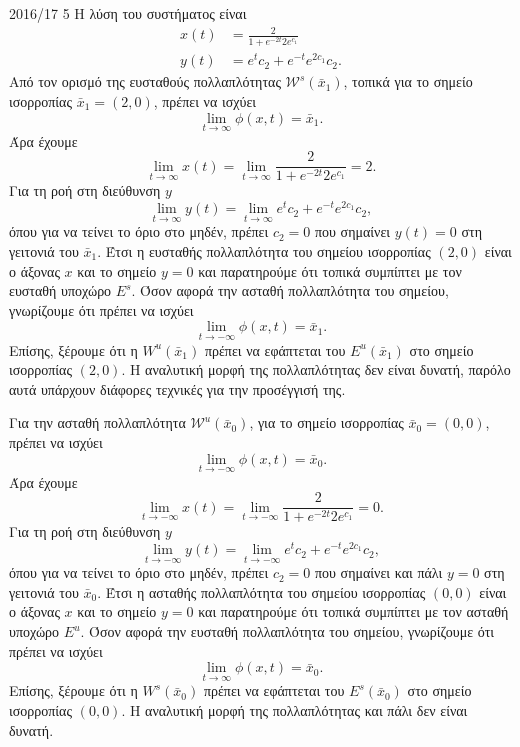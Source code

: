 \begin{solution}{2016/17 5}
    Η λύση του συστήματος είναι
    \begin{align*}
        x(t) &= \frac{2}{1 + e^{-2t}2e^{c_1}} \\
        y(t) &= e^{t}c_2 + e^{-t}e^{2c_1}c_2.
    \end{align*}
    Από τον ορισμό της ευσταθούς πολλαπλότητας \( \mathcal{W}^s(\bar{x}_1) \),
    τοπικά για το σημείο ισορροπίας \( \bar{x}_1 = (2, 0) \), πρέπει να ισχύει
    \[
        \lim_{t \to \infty} \phi(x, t) = \bar{x}_1.
    \]
    Άρα έχουμε
    \[
        \lim_{t \to \infty} x(t) =
        \lim_{t \to \infty} \frac{2}{1 + e^{-2t}2e^{c_1}} = 2.
    \]
    Για τη ροή στη διεύθυνση \( y \)
    \[
        \lim_{t \to \infty} y(t) =
        \lim_{t \to \infty} e^{t}c_2 + e^{-t}e^{2c_1}c_2,
    \]
    όπου για να τείνει το όριο στο μηδέν, πρέπει \( c_2 = 0 \) που σημαίνει
    \( y(t) = 0 \) στη γειτονιά του \( \bar{x}_1 \). Έτσι η ευσταθής
    πολλαπλότητα του σημείου ισορροπίας \( (2, 0) \) είναι ο άξονας \( x \) και
    το σημείο \( y = 0 \) και παρατηρούμε ότι τοπικά συμπίπτει με τον
    ευσταθή υποχώρο \( E^s \). Όσον αφορά την ασταθή πολλαπλότητα του σημείου,
    γνωρίζουμε ότι πρέπει να ισχύει
    \[
        \lim_{t \to -\infty} \phi(x, t) = \bar{x}_1.
    \]
    Επίσης, ξέρουμε ότι η \( W^u(\bar{x}_1) \) πρέπει να εφάπτεται του \(
    E^u(\bar{x}_1) \) στο σημείο ισορροπίας \( (2, 0) \). Η αναλυτική μορφή της
    πολλαπλότητας δεν είναι δυνατή, παρόλο αυτά υπάρχουν διάφορες τεχνικές για
    την προσέγγισή της.

    Για την ασταθή πολλαπλότητα \( \mathcal{W}^u(\bar{x}_0) \), για το σημείο
    ισορροπίας \( \bar{x}_0 = (0, 0) \), πρέπει να ισχύει
    \[
        \lim_{t \to -\infty} \phi(x, t) = \bar{x}_0.
    \]
    Άρα έχουμε
    \[
        \lim_{t \to -\infty} x(t) =
        \lim_{t \to -\infty} \frac{2}{1 + e^{-2t}2e^{c_1}} = 0.
    \]
    Για τη ροή στη διεύθυνση \( y \)
    \[
        \lim_{t \to -\infty} y(t) =
        \lim_{t \to -\infty} e^{t}c_2 + e^{-t}e^{2c_1}c_2,
    \]
    όπου για να τείνει το όριο στο μηδέν, πρέπει \( c_2 = 0 \) που σημαίνει και
    πάλι \( y = 0 \) στη γειτονιά του \( \bar{x}_0 \). Έτσι η ασταθής πολλαπλότητα
    του σημείου ισορροπίας \( (0, 0) \) είναι ο άξονας \( x \) και το σημείο
    \( y = 0 \) και παρατηρούμε ότι τοπικά συμπίπτει με τον ασταθή υποχώρο
    \( E^u \). Όσον αφορά την ευσταθή πολλαπλότητα του σημείου, γνωρίζουμε ότι
    πρέπει να ισχύει
    \[
        \lim_{t \to \infty} \phi(x, t) = \bar{x}_0.
    \]
    Επίσης, ξέρουμε ότι η \( W^s(\bar{x}_0) \) πρέπει να εφάπτεται του \(
    E^s(\bar{x}_0) \) στο σημείο ισορροπίας \( (0, 0) \). Η αναλυτική μορφή της
    πολλαπλότητας και πάλι δεν είναι δυνατή.


\end{solution}
